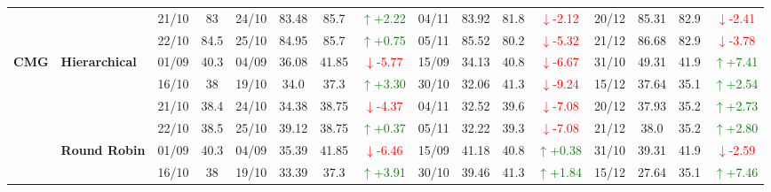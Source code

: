 {\begin{longtable}{llcc|cccc|cccc|cccc}
&
& 21/10 & 83 & 24/10 & 83.48 & 85.7 & \textcolor{green}{\(\uparrow\)+2.22} & 04/11 & 83.92 & 81.8 & \textcolor{red}{\(\downarrow\)-2.12} & 20/12 & 85.31 & 82.9 & \textcolor{red}{\(\downarrow\)-2.41} \\

&
& 22/10 & 84.5 & 25/10 & 84.95 & 85.7 & \textcolor{green}{\(\uparrow\)+0.75} & 05/11 & 85.52 & 80.2 & \textcolor{red}{\(\downarrow\)-5.32} & 21/12 & 86.68 & 82.9 & \textcolor{red}{\(\downarrow\)-3.78} \\




\midrule


\multirow{12}{*}{\textbf{CMG}} 
& \textbf{Hierarchical}
& 01/09 & 40.3 & 04/09 & 36.08 & 41.85 & \textcolor{red}{\(\downarrow\)-5.77} & 15/09 & 34.13 & 40.8 & \textcolor{red}{\(\downarrow\)-6.67} & 31/10 & 49.31 & 41.9 & \textcolor{green}{\(\uparrow\)+7.41} \\

& 
& 16/10 & 38 & 19/10 & 34.0 & 37.3 & \textcolor{green}{\(\uparrow\)+3.30} & 30/10 & 32.06 & 41.3 & \textcolor{red}{\(\downarrow\)-9.24} & 15/12 & 37.64 & 35.1 & \textcolor{green}{\(\uparrow\)+2.54} \\

& 
& 21/10 & 38.4 & 24/10 & 34.38 & 38.75 & \textcolor{red}{\(\downarrow\)-4.37} & 04/11 & 32.52 & 39.6 & \textcolor{red}{\(\downarrow\)-7.08} & 20/12 & 37.93 & 35.2 & \textcolor{green}{\(\uparrow\)+2.73} \\

&
& 22/10 & 38.5 & 25/10 & 39.12 & 38.75 & \textcolor{green}{\(\uparrow\)+0.37} & 05/11 & 32.22 & 39.3 & \textcolor{red}{\(\downarrow\)-7.08} & 21/12 & 38.0 & 35.2 & \textcolor{green}{\(\uparrow\)+2.80} \\
\cmidrule(lr){2-16}


& \textbf{Round Robin}
& 01/09 & 40.3 & 04/09 & 35.39 & 41.85 & \textcolor{red}{\(\downarrow\)-6.46} & 15/09 & 41.18 & 40.8 & \textcolor{green}{\(\uparrow\)+0.38} & 31/10 & 39.31 & 41.9 & \textcolor{red}{\(\downarrow\)-2.59} \\

& 
& 16/10 & 38 & 19/10 & 33.39 & 37.3 & \textcolor{green}{\(\uparrow\)+3.91} & 30/10 & 39.46 & 41.3 & \textcolor{green}{\(\uparrow\)+1.84} & 15/12 & 27.64 & 35.1 & \textcolor{green}{\(\uparrow\)+7.46} \\


\end{longtable}}
